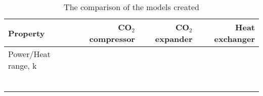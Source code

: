 \begin{table}
\label{tab:DiscussionComparison}
\caption{The comparison of the models created}
\begin{center}
\begin{tabulary}{0.9\textwidth}{LRRR}
\toprule
Property 	&	CO$_2$ compressor & CO$_2$	expander & Heat exchanger \\
\midrule
Power/Heat range, k& & & \\
& & & \\
& & & \\
& & & \\
& & & \\
& & & \\
& & & \\
\bottomrule
\end{tabulary}
\end{center}
\end{table}